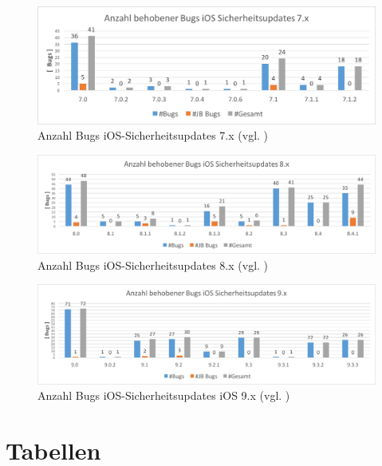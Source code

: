 \newpage
\begin{figure}[htbp!]
        \centering
                \includegraphics[scale=0.7]{Bilder/iOSSicherheitsupdate7.png}
        \caption{Anzahl Bugs iOS-Sicherheitsupdates 7.x (vgl. \cite{Apple[7]}) \protect\footnotemark}
        \label{fig:AnalyseiOSSicherheitsupdate7}
\end{figure}
\begin{figure}[htbp!]
        \centering
                \includegraphics[scale=0.54]{Bilder/iOSSicherheitsupdate8.png}
        \caption{Anzahl Bugs iOS-Sicherheitsupdates 8.x (vgl. \cite{Apple[7]}) \protect\footnotemark}
        \label{fig:AnalyseiOSSicherheitsupdate8}
\end{figure}

\begin{figure}[ht!]
        \centering
                \includegraphics[scale=0.55]{Bilder/iOSSicherheitsupdate9.png}
        \caption{Anzahl Bugs iOS-Sicherheitsupdates iOS 9.x (vgl. \cite{Apple[7]}) \protect\footnotemark}
        \label{fig:AnalyseiOSSicherheitsupdate9}
\end{figure}
\newpage

\chapter{Tabellen}
\newpage

